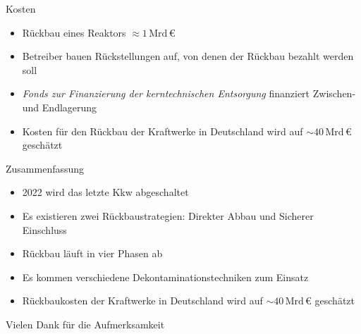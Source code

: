 \begin{frame}{Kosten}
  \begin{itemize}
    \setlength\itemsep{1.2em}
    \item{ Rückbau eines Reaktors $\approx 1 \,\mathrm{Mrd} \, \euro$ }
    \item{ Betreiber bauen Rückstellungen auf, von denen der Rückbau bezahlt werden soll}
    \item{ \emph{Fonds zur Finanzierung der kerntechnischen Entsorgung} finanziert Zwischen- und Endlagerung}
    \item{ Kosten für den Rückbau der Kraftwerke in Deutschland wird auf $ \sim \num{40} \, \mathrm{Mrd} \,\euro$ geschätzt}
  \end{itemize}
\end{frame}



\begin{frame}{Zusammenfassung}
  \begin{itemize}
    \setlength\itemsep{1.2em}
    \item { 2022 wird das letzte Kkw abgeschaltet}
    \item { Es existieren zwei Rückbaustrategien:  Direkter Abbau und Sicherer Einschluss}
    \item { Rückbau läuft in vier Phasen ab }
    \item { Es kommen verschiedene Dekontaminationstechniken zum Einsatz}
    \item { Rückbaukosten der Kraftwerke in Deutschland wird auf  $\sim \num{40} \, \mathrm{Mrd} \,\euro$ geschätzt}
  \end{itemize}
\end{frame}



\begin{frame}[allowframebreaks]
  \nocite{*}
  \printbibliography
\end{frame}



\begin{frame}
  \begin{center}
  Vielen Dank für die
  Aufmerksamkeit
  \end{center}
\end{frame}




